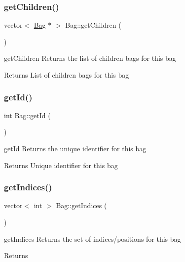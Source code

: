 \subsubsection{\texorpdfstring{get\+Children()}{getChildren()}}
{\footnotesize\ttfamily vector$<$ \hyperlink{class_bag}{Bag} $\ast$ $>$ Bag\+::get\+Children (\begin{DoxyParamCaption}{ }\end{DoxyParamCaption})}



get\+Children Returns the list of children bags for this bag 

\begin{DoxyReturn}{Returns}
List of children bags for this bag 
\end{DoxyReturn}
\mbox{\label{class_bag_a7d77eb7e82f14c3266a979e08e0001e9}} 
\subsubsection{\texorpdfstring{get\+Id()}{getId()}}
{\footnotesize\ttfamily int Bag\+::get\+Id (\begin{DoxyParamCaption}{ }\end{DoxyParamCaption})}



get\+Id Returns the unique identifier for this bag 

\begin{DoxyReturn}{Returns}
Unique identifier for this bag 
\end{DoxyReturn}
\mbox{\label{class_bag_ad05a3a0069514372df097ec7d0cbe638}} 
\subsubsection{\texorpdfstring{get\+Indices()}{getIndices()}}
{\footnotesize\ttfamily vector$<$ int $>$ Bag\+::get\+Indices (\begin{DoxyParamCaption}{ }\end{DoxyParamCaption})}



get\+Indices Returns the set of indices/positions for this bag 

\begin{DoxyReturn}{Returns}

\end{DoxyReturn}
\mbox{\label{class_bag_aab67f05a274db8a02738f88c250f4cb1}} 

